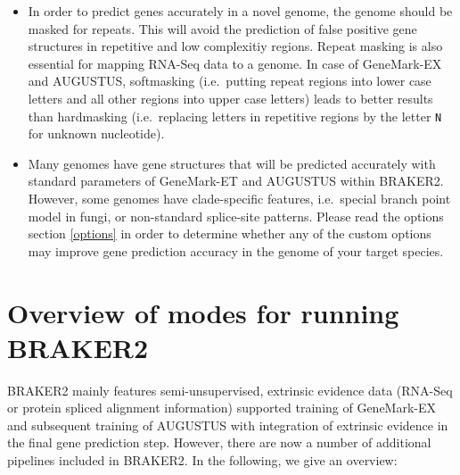\documentclass[a4paper,10pt]{report}
\begin{document}
\begin{itemize}
 \item In order to predict genes accurately in a novel genome, the genome should be masked for repeats. This will avoid the prediction of false positive gene structures in repetitive and low complexitiy regions. Repeat masking is also essential for mapping RNA-Seq data to a genome. In case of GeneMark-EX and AUGUSTUS, softmasking (i.e.~putting repeat regions into lower case letters and all other regions into upper case letters) leads to better results than hardmasking (i.e.~replacing letters in repetitive regions by the letter \texttt{N} for unknown nucleotide).
 
 \item Many genomes have gene structures that will be predicted accurately with standard parameters of GeneMark-ET and AUGUSTUS within BRAKER2. However, some genomes have clade-specific features, i.e.~special branch point model in fungi, or non-standard splice-site patterns. Please read the options section \ref{options} in order to determine whether any of the custom options may improve gene prediction accuracy in the genome of your target species.
\end{itemize}

\section{Overview of modes for running BRAKER2}

BRAKER2 mainly features semi-unsupervised, extrinsic evidence data (RNA-Seq or protein spliced alignment information) supported training of GeneMark-EX and subsequent training of AUGUSTUS with integration of extrinsic evidence in the final gene prediction step. However, there are now a number of additional pipelines included in BRAKER2. In the following, we give an overview:
\end{document}
